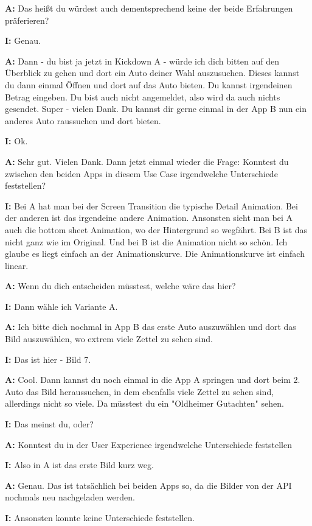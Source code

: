 \begin{myparindent}{0pt}
\textbf{A:} Das heißt du würdest auch dementsprechend keine der beide Erfahrungen präferieren?

\textbf{I:} Genau.

\textbf{A:} Dann - du bist ja jetzt in Kickdown A - würde ich dich bitten auf den Überblick zu gehen und dort ein Auto deiner Wahl auszusuchen. Dieses kannst du dann einmal Öffnen und dort auf das Auto bieten. Du kannst irgendeinen Betrag eingeben. Du bist auch nicht angemeldet, also wird da auch nichts gesendet. 
Super - vielen Dank. Du kannst dir gerne einmal in der App B nun ein anderes Auto raussuchen und dort bieten.

\textbf{I:} Ok. 

\textbf{A:} Sehr gut. Vielen Dank. Dann jetzt einmal wieder die Frage: Konntest du zwischen den beiden Apps in diesem Use Case irgendwelche Unterschiede feststellen?

\textbf{I:} Bei A hat man bei der Screen Transition die typische Detail Animation. Bei der anderen ist das irgendeine andere Animation. Ansonsten sieht man bei A auch die bottom sheet Animation, wo der Hintergrund so wegfährt. Bei B ist das nicht ganz wie im Original. Und bei B ist die Animation nicht so schön. Ich glaube es liegt einfach an der Animationskurve. Die Animationskurve ist einfach linear.

\textbf{A:} Wenn du dich entscheiden müsstest, welche wäre das hier?

\textbf{I:} Dann wähle ich Variante A.

\textbf{A:} Ich bitte dich nochmal in App B das erste Auto auszuwählen und dort das Bild auszuwählen, wo extrem viele Zettel zu sehen sind. 

 \textbf{I:} Das ist hier - Bild 7. 

\textbf{A:} Cool. Dann kannst du noch einmal in die App A springen und dort beim 2. Auto das Bild heraussuchen, in dem ebenfalls viele Zettel zu sehen sind, allerdings nicht so viele. Da müsstest du ein "Oldheimer Gutachten" sehen.

\textbf{I:} Das meinst du, oder?

\textbf{A:} Konntest du in der User Experience irgendwelche Unterschiede feststellen

\textbf{I:} Also in A ist das erste Bild kurz weg. 

\textbf{A:} Genau. Das ist tatsächlich bei beiden Apps so, da die Bilder von der API nochmals neu nachgeladen werden.

\textbf{I:} Ansonsten konnte keine Unterschiede feststellen.


\end{myparindent}
